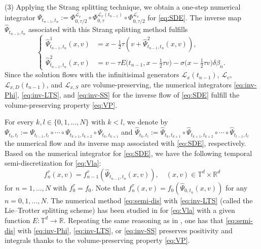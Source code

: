 \documentclass[11pt,reqno]{amsproc}
\newcommand{\R}{\mathbb{R}}
\numberwithin{equation}{section}
\begin{document}
(3) Applying the Strang splitting technique, we obtain a one-step numerical integrator 
$\Psi_{t_{n-1},t_n}:=\Phi^{\mathcal L_{v}}_{0,\tau/2}\circ\Phi^{\mathcal{L}_{x}(t_{n-1})}_{0,\tau}\circ
\Phi^{\mathcal L_{v}}_{0,\tau/2}$ for \eqref{eq:SDE}.
The inverse map $\widehat{\Psi}_{t_{n-1},t_n}$ associated with this Strang splitting method fulfills
\begin{equation}
\label{eq:inv-SS}\tag{SSM}
		\left\{
		\begin{split}
			\widehat{\Psi}^1_{t_{n-1},t_n}(x,v)&=x-\frac{1}{2}\tau (v+\widehat{\Psi}^2_{t_{n-1},t_n}(x,v)),\\
			\widehat{\Psi}^2_{t_{n-1},t_n}(x,v)&=v-\tau E\big(t_{n-1},x-\frac{1}{2}\tau v\big)-\sigma\big(x-\frac{1}{2}\tau v\big)\delta\beta_{n}.
		\end{split}
		\right.
\end{equation}
	Since the solution flows with the infinitisimal generators $\mathcal{L}_{x}(t_{n-1})$, $\mathcal{L}_{v}$, $\mathcal{L}_{x,D}(t_{n-1})$, and $\mathcal{L}_{x,S}$ are volume-preserving, the numerical integrators \eqref{eq:inv-Phi}, \eqref{eq:inv-LTS}, and \eqref{eq:inv-SS} for the inverse flow of \eqref{eq:SDE} fulfill the volume-preserving property \eqref{eq:VP}.
	

For every $k,l\in\{0,1,\ldots,N\}$ with $k<l$, we denote by $\Psi_{t_k,t_l}:=\Psi_{t_{l-1},t_{l}}\circ\cdots\circ\Psi_{t_{k+1},t_{k+2}}\circ\Psi_{t_k,t_{k+1}}$ and $\widehat{\Psi}_{t_k,t_l}:=\widehat{\Psi}_{t_k,t_{k+1}}\circ\widehat{\Psi}_{t_{k+1},t_{k+2}}\circ\cdots\circ\widehat{\Psi}_{t_{l-1},t_{l}}$ the numerical flow and its inverse map associated with \eqref{eq:SDE}, respectively.
Based on the numerical integrator for \eqref{eq:SDE},
we have the following temporal semi-discretization for \eqref{eq:Vla}:
\begin{equation}\label{eq:semi-dis}
	f^\tau_n(x,v)=f_{n-1}^\tau(\widehat{\Psi}_{t_{n-1},t_n}(x,v)),\quad (x,v)\in\mathbb{T}^d\times\R^d
\end{equation}
for $n=1,\ldots,N$
with $f^\tau_0=f_0$. Note that $f^\tau_n(x,v)=f_0(\widehat{\Psi}_{0,t_n}(x,v))$ for any $n=0,1,\ldots,N$. The numerical method \eqref{eq:semi-dis} with \eqref{eq:inv-LTS} (called the Lie--Trotter splitting scheme) has been studied in \cite{BC24} for \eqref{eq:Vla} with a given function $E:\mathbb{T}^d\to \R$. 
Repeating the same reasoning as in \cite[Proposition 12]{BC24}, one has that \eqref{eq:semi-dis} with \eqref{eq:inv-Phi}, \eqref{eq:inv-LTS}, or \eqref{eq:inv-SS}
 preserves positivity and integrals thanks to the volume-preserving property \eqref{eq:VP}. 
\end{document}
